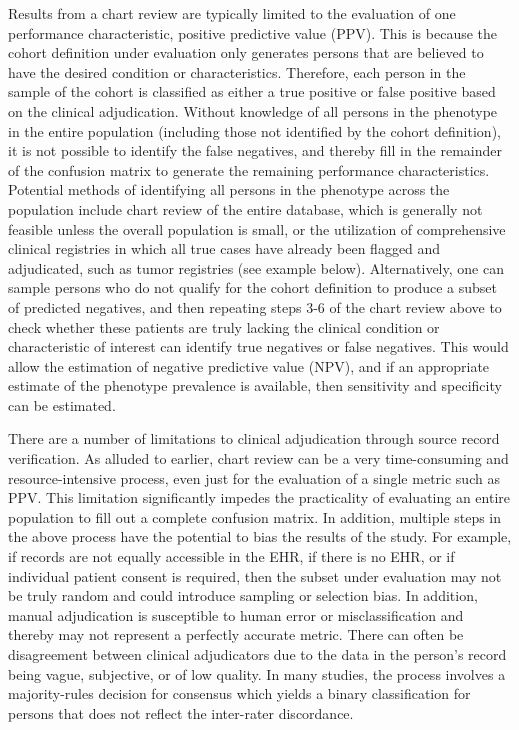\documentclass[11pt]{book}
\theoremstyle{definition}
\theoremstyle{definition}
\theoremstyle{definition}
\theoremstyle{remark}
\begin{document}
Results from a chart review are typically limited to the evaluation of
one performance characteristic, positive predictive value (PPV). This is
because the cohort definition under evaluation only generates persons
that are believed to have the desired condition or characteristics.
Therefore, each person in the sample of the cohort is classified as
either a true positive or false positive based on the clinical
adjudication. Without knowledge of all persons in the phenotype in the
entire population (including those not identified by the cohort
definition), it is not possible to identify the false negatives, and
thereby fill in the remainder of the confusion matrix to generate the
remaining performance characteristics. Potential methods of identifying
all persons in the phenotype across the population include chart review
of the entire database, which is generally not feasible unless the
overall population is small, or the utilization of comprehensive
clinical registries in which all true cases have already been flagged
and adjudicated, such as tumor registries (see example below).
Alternatively, one can sample persons who do not qualify for the cohort
definition to produce a subset of predicted negatives, and then
repeating steps 3-6 of the chart review above to check whether these
patients are truly lacking the clinical condition or characteristic of
interest can identify true negatives or false negatives. This would
allow the estimation of negative predictive value (NPV), and if an
appropriate estimate of the phenotype prevalence is available, then
sensitivity and specificity can be estimated.

There are a number of limitations to clinical adjudication through
source record verification. As alluded to earlier, chart review can be a
very time-consuming and resource-intensive process, even just for the
evaluation of a single metric such as PPV. This limitation significantly
impedes the practicality of evaluating an entire population to fill out
a complete confusion matrix. In addition, multiple steps in the above
process have the potential to bias the results of the study. For
example, if records are not equally accessible in the EHR, if there is
no EHR, or if individual patient consent is required, then the subset
under evaluation may not be truly random and could introduce sampling or
selection bias. In addition, manual adjudication is susceptible to human
error or misclassification and thereby may not represent a perfectly
accurate metric. There can often be disagreement between clinical
adjudicators due to the data in the person's record being vague,
subjective, or of low quality. In many studies, the process involves a
majority-rules decision for consensus which yields a binary
classification for persons that does not reflect the inter-rater
discordance.
\end{document}

